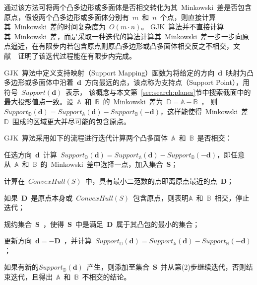 通过该方法可将两个凸多边形或多面体是否相交转化为其~Minkowski~差是否包含原点，假设两个凸多边形或多面体分别有~$m$~和~$n$~个点，则直接计算其~Minkowski~差的时间复杂度为~$O(m \cdot n)$。
GJK~算法并不直接计算其~Minkowski~差，而是采取一种迭代的算法计算其~Minkowski~差一步一步向原点逼近，在有限步内若包含原点则原凸多边形或凸多面体相交反之不相交，文献~~证明了该迭代过程能在有限步内完成。

GJK~算法中定义支持映射（Support Mapping）函数为将给定的方向~$\bm{d}$~映射为凸多边形或多面体中沿着~$\bm{d}$~方向最远的点，该点称为支持点（Support Point），用符号~$Support(\bm{d})$~表示，
该概念与本文第~\ref{sec:search:planes}节中搜索截面中的最大投影值点一致。设~$\mathbb{A}$~和~$\mathbb{B}$~的~Minkowski~差为~$\mathbb{D} = \mathbb{A}-\mathbb{B}$~，
则~$Support_\mathbb{D}(\bm{d}) = Support_\mathbb{A}(\bm{d}) - Support_\mathbb{B}(-\bm{d})$，这样能使得~Minkowski~差~$\mathbb{D}$~围成的区域更大并尽可能的包含原点。

GJK~算法采用如下的流程\cite{ericson2005real}进行迭代计算两个凸多面体~$\mathbb{A}$~和~$\mathbb{B}$~是否相交：

\begin{inparaenum}[(1)]
  \item 任选方向~$\bm{d}$~计算~$Support_\mathbb{D}(\bm{d}) = Support_\mathbb{A}(\bm{d}) - Support_\mathbb{B}(-\bm{d})$，即任意从~$\mathbb{A}$~和~$\mathbb{B}$~的~Minkowski~差中选择一点，加入集合~$\bm{S}$；\\ \indent
  \item 计算在~$ConvexHull(S)$~中，具有最小二范数的点即离原点最近的点~$\bm{D}$； \\ \indent
  \item 如果~$\bm{D}$~是原点本身或~$ConvexHull(S)$~包含原点，则表明$\mathbb{A}$~和~$\mathbb{B}$~相交，停止迭代；\\ \indent
  \item 规约集合~$\bm{S}$~，使得~$\bm{S}$~中是满足~$\bm{D}$~属于其凸包的最小的集合；\\ \indent
  \item 更新方向~$\bm{d} = -\bm{D}$~，并计算~$Support_\mathbb{D}(\bm{d}) = Support_\mathbb{A}(\bm{d}) - Support_\mathbb{B}(-\bm{d})$；\\ \indent
  \item 如果有新的$Support_\mathbb{D}(\bm{d})$~产生，则添加至集合~$\bm{S}$~并从第(2)步继续迭代，否则结束迭代，且得出~$\mathbb{A}$~和~$\mathbb{B}$~不相交的结论。
\end{inparaenum}

